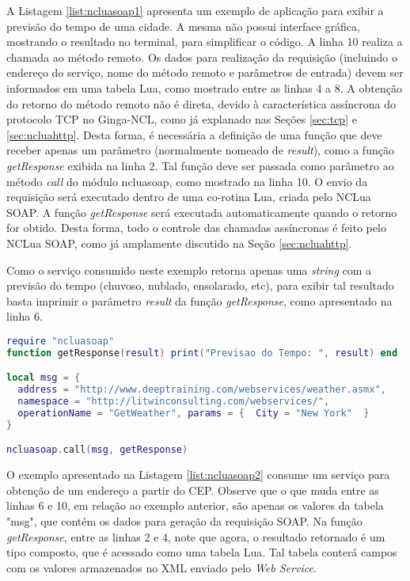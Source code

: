 A Listagem \ref{list:ncluasoap1} apresenta um exemplo de aplicação para exibir a previsão do tempo
de uma cidade. A mesma não possui interface gráfica, mostrando o resultado no terminal, para simplificar
o código. A linha 10 realiza a chamada ao método remoto. Os dados para realização da requisição
(incluindo o endereço do serviço, nome do método remoto e parâmetros de entrada) devem ser informados
em uma tabela Lua, como mostrado entre as linhas 4 a 8. A obtenção do retorno
do método remoto não é direta, devido à característica assíncrona do protocolo TCP
no Ginga-NCL, como já explanado nas Seções \ref{sec:tcp} e \ref{sec:ncluahttp}.
Desta forma, é necessária a definição de uma função que deve receber apenas um parâmetro
(normalmente nomeado de \textit{result}), como a função \textit{getResponse} exibida na linha 2. 
Tal função deve ser passada como parâmetro ao método \textit{call} do módulo ncluasoap,
como mostrado na linha 10. O envio da requisição será executado dentro de uma co-rotina Lua,
criada pelo NCLua SOAP. A função \textit{getResponse} será executada automaticamente quando o retorno for obtido.
Desta forma, todo o controle das chamadas assíncronas é feito pelo NCLua SOAP, como já 
amplamente discutido na Seção \ref{sec:ncluahttp}.

Como o serviço consumido neste exemplo retorna apenas uma \textit{string} com a previsão do tempo (chuvoso, nublado, ensolarado, etc),
para exibir tal resultado basta imprimir o parâmetro \textit{result} da função \textit{getResponse}, como 
apresentado na linha 6.

\begin{lstlisting}[caption=Exemplo de consumo de \textit{Web Service} de previsão do tempo, label=list:ncluasoap1, language=lua]
require "ncluasoap"
function getResponse(result) print("Previsao do Tempo: ", result) end

local msg = {
  address = "http://www.deeptraining.com/webservices/weather.asmx",
  namespace = "http://litwinconsulting.com/webservices/",
  operationName = "GetWeather", params = {  City = "New York"  }  
}

ncluasoap.call(msg, getResponse)
\end{lstlisting}

O exemplo apresentado na Listagem \ref{list:ncluasoap2} consume um serviço para obtenção de um endereço a partir do CEP.
Observe que o que muda entre as linhas 6 e 10, em relação ao exemplo anterior, são apenas os valores
da tabela "msg", que contém os dados para geração da requisição SOAP. Na função \textit{getResponse}, entre as linhas
2 e 4, note que agora, o resultado retornado é um tipo composto, que é acessado como uma tabela Lua.
Tal tabela conterá campos com os valores armazenados no XML enviado pelo \textit{Web Service}.

